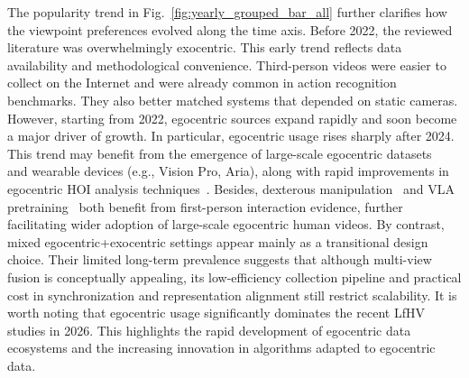 \documentclass[Afour,sageh,times]{sagej}
\begin{document}
The popularity trend in Fig.~\ref{fig:yearly_grouped_bar_all} further clarifies how the viewpoint preferences evolved along the time axis. Before 2022, the reviewed literature was overwhelmingly exocentric. This early trend reflects data availability and methodological convenience. Third-person videos were easier to collect on the Internet and were already common in action recognition benchmarks. They also better matched systems that depended on static cameras. However, starting from 2022, egocentric sources expand rapidly and soon become a major driver of growth. In particular, egocentric usage rises sharply after 2024. This trend may benefit from the emergence of large-scale egocentric datasets~\citep{grauman2022ego4d,liu2022hoi4d,wang2023holoassist,banerjee2024hot3d,hoque2025egodex} and wearable devices (e.g., Vision Pro, Aria), along with rapid improvements in egocentric HOI analysis techniques~\citep{labbe2022megapose,wen2023bundlesdf,wen2024foundationpose,pavlakos2024reconstructing,karaev2024cotracker,karaev2025cotracker3}. Besides, dexterous manipulation~\citep{shaw2023videodex,wen2025gr,zhang2026unidex} and VLA pretraining~\citep{yuan2025motiontrans,kareer2025emergence,cheang2025gr} both benefit from first-person interaction evidence, further facilitating wider adoption of large-scale egocentric human videos. By contrast, mixed egocentric+exocentric settings appear mainly as a transitional design choice. Their limited long-term prevalence suggests that although multi-view fusion is conceptually appealing, its low-efficiency collection pipeline and practical cost in synchronization and representation alignment still restrict scalability. It is worth noting that egocentric usage significantly dominates the recent LfHV studies in 2026. This highlights the rapid development of egocentric data ecosystems and the increasing innovation in algorithms adapted to egocentric data.
\end{document}
